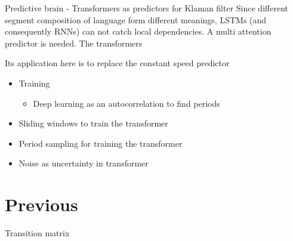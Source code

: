 \begin{frame}[allowframebreaks]{Predictive brain - Transformers as predictors for Klaman filter}
    Since different segment composition of language form different meanings, LSTMs (and consequently RNNs) can not catch local dependencies. A multi attention predictor is needed. The transformers \cite{vaswani-2017-attention-is-all-you-need}
    
    Its application here is to replace the constant speed predictor
    
    
    \begin{itemize}
        \item Training
        \begin{itemize}
            \item Deep learning as an autocorrelation to find periods
        \end{itemize}
        \item Sliding windows to train the transformer
        \item Period sampling for training the transformer
        \item Noise as uncertainty in transformer
    
    \end{itemize}
    
    \section{Previous}
    Transition matrix
\end{frame}